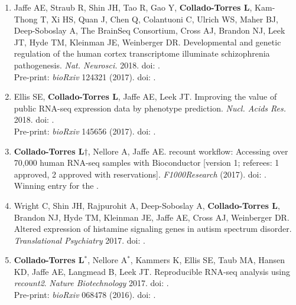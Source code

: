 \begin{enumerate}
        \item Jaffe AE, Straub R, Shin JH, Tao R, Gao Y, \textbf{Collado-Torres L}, Kam-Thong T, Xi HS, Quan J, Chen Q, Colantuoni C, Ulrich WS, Maher BJ, Deep-Soboslay A, The BrainSeq Consortium, Cross AJ, Brandon NJ, Leek JT, Hyde TM, Kleinman JE, Weinberger DR. Developmental and genetic regulation of the human cortex transcriptome illuminate schizophrenia pathogenesis. \emph{Nat. Neurosci.} 2018. doi: .
        \\ Pre-print: \emph{bioRxiv} 124321 (2017). doi: .
        
        \item Ellis SE, \textbf{Collado-Torres L}, Jaffe AE, Leek JT. Improving the value of public RNA-seq expression data by phenotype prediction. \emph{Nucl. Acids Res.} 2018. doi: .
        \\ Pre-print: \emph{bioRxiv} 145656 (2017). doi: .
        
        \item \textbf{Collado-Torres L}$\dagger$, Nellore A, Jaffe AE. 
        recount workflow: Accessing over 70,000 human RNA-seq samples with Bioconductor [version 1; referees: 1 approved, 2 approved with reservations]. \emph{F1000Research} (2017). doi: .
        \\ Winning entry for the .
        
        \item Wright C, Shin JH, Rajpurohit A, Deep-Soboslay A, \textbf{Collado-Torres L}, Brandon NJ, Hyde TM, Kleinman JE, Jaffe AE, Cross AJ, Weinberger DR. Altered expression of histamine signaling genes in autism spectrum disorder. \emph{Translational Psychiatry} 2017. doi: .
        
        \item \textbf{Collado-Torres L}$^{*}$, Nellore A$^{*}$, Kammers K, Ellis SE, Taub MA, Hansen KD, Jaffe AE, Langmead B, Leek JT. Reproducible RNA-seq analysis using \emph{recount2}. \emph{Nature Biotechnology} 2017. doi: .
        \\ Pre-print: \emph{bioRxiv} 068478 (2016). doi: .
        

\end{enumerate}
